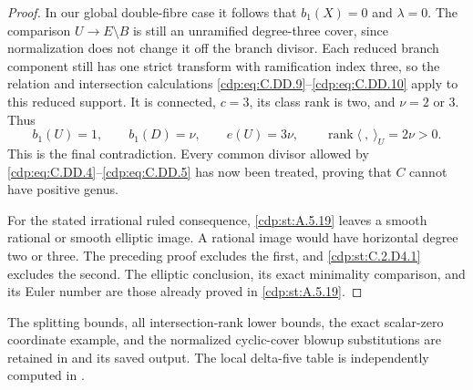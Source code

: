 \begin{proof}
In our global double-fibre case it follows that
$b_1(X)=0$ and $\lambda=0$.
The comparison $U\to E\setminus B$ is still an
unramified degree-three cover, since normalization
does not change it off the branch divisor.
Each reduced branch component still has one
strict transform with ramification index three,
so the relation and intersection calculations
\eqref{cdp:eq:C.DD.9}--\eqref{cdp:eq:C.DD.10} apply to this reduced support.
It is connected, $c=3$, its class rank is two,
and $\nu=2$ or $3$. Thus
\[
 b_1(U)=1,\qquad b_1(D)=\nu,\qquad e(U)=3\nu,
 \qquad\operatorname{rank}\langle\ ,\ \rangle_U
                                      =2\nu>0.
\tag{C.DD.21}\label{cdp:eq:C.DD.21}
\]
This is the final contradiction. Every common
divisor allowed by \eqref{cdp:eq:C.DD.4}--\eqref{cdp:eq:C.DD.5} has now
been treated, proving that $C$ cannot have
positive genus.

For the stated irrational ruled consequence,
\ref{cdp:st:A.5.19} leaves a smooth rational or smooth elliptic
image. A rational image would have horizontal
degree two or three. The preceding proof excludes
the first, and \ref{cdp:st:C.2.D4.1} excludes the second.
The elliptic conclusion, its exact minimality
comparison, and its Euler number are those already
proved in \ref{cdp:st:A.5.19}.
\end{proof}

The splitting bounds, all intersection-rank lower
bounds, the exact scalar-zero coordinate example,
and the normalized cyclic-cover blowup substitutions
are retained in  and
its saved output. The local delta-five table is
independently computed in .


